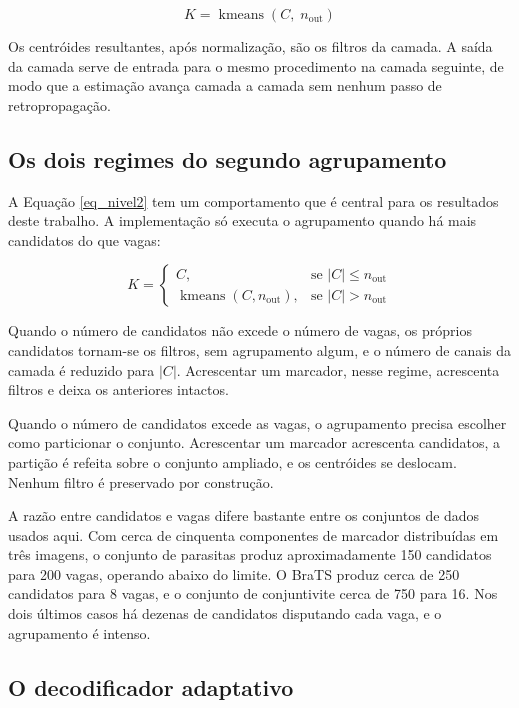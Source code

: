 \begin{equation}
K = \operatorname{kmeans}(C,\; n_{\text{out}})
\label{eq_nivel2}
\end{equation}

Os centróides resultantes, após normalização, são os filtros da camada. A saída da camada serve de entrada para o mesmo procedimento na camada seguinte, de modo que a estimação avança camada a camada sem nenhum passo de retropropagação.

\subsection{Os dois regimes do segundo agrupamento}

A Equação \ref{eq_nivel2} tem um comportamento que é central para os resultados deste trabalho. A implementação só executa o agrupamento quando há mais candidatos do que vagas:

\begin{equation}
K =
\begin{cases}
C, & \text{se } |C| \leq n_{\text{out}} \\[4pt]
\operatorname{kmeans}(C, n_{\text{out}}), & \text{se } |C| > n_{\text{out}}
\end{cases}
\label{eq_regimes}
\end{equation}

Quando o número de candidatos não excede o número de vagas, os próprios candidatos tornam-se os filtros, sem agrupamento algum, e o número de canais da camada é reduzido para $|C|$. Acrescentar um marcador, nesse regime, acrescenta filtros e deixa os anteriores intactos.

Quando o número de candidatos excede as vagas, o agrupamento precisa escolher como particionar o conjunto. Acrescentar um marcador acrescenta candidatos, a partição é refeita sobre o conjunto ampliado, e os centróides se deslocam. Nenhum filtro é preservado por construção.

A razão entre candidatos e vagas difere bastante entre os conjuntos de dados usados aqui. Com cerca de cinquenta componentes de marcador distribuídas em três imagens, o conjunto de parasitas produz aproximadamente 150 candidatos para 200 vagas, operando abaixo do limite. O BraTS produz cerca de 250 candidatos para 8 vagas, e o conjunto de conjuntivite cerca de 750 para 16. Nos dois últimos casos há dezenas de candidatos disputando cada vaga, e o agrupamento é intenso.

\subsection{O decodificador adaptativo}\label{sec_decoder}

